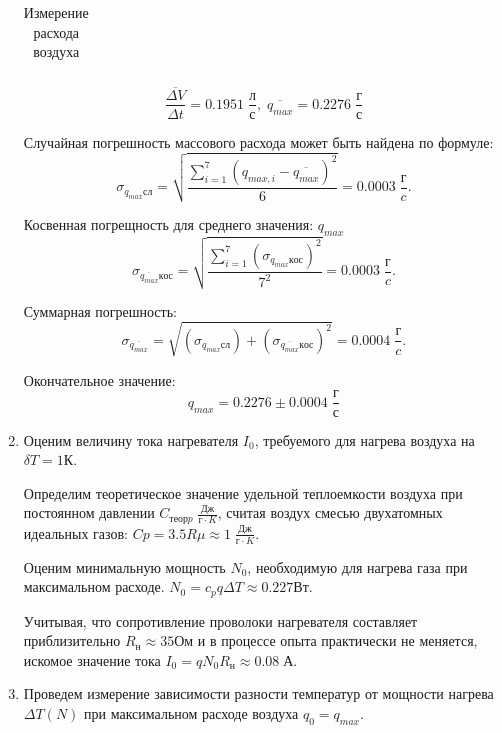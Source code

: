 \documentclass[a4paper,12pt]{article}
\begin{document}
\begin{enumerate}
\begin{table}
\begin{center}
\begin{tabular}{|c|c|c|c|c|}
	\end{tabular}
	\end{center}
	\caption{Измерение расхода воздуха}
	\end{table}
	$$\overline{\frac{\Delta V}{\Delta t}} = 0.1951 \; \frac{л}{с} ,\; \overline{q_{max}} = 0.2276 \; \frac{г}{с} $$
	
	Случайная погрешность массового расхода может быть найдена по формуле: $$\sigma_{q_{max}сл} =  \sqrt{\frac{\sum_{i=1}^{7} (q_{max,i}-\overline{q_{max}})^2}{6}} = 0.0003 \; \frac{г}{c}.$$
	
	Косвенная погрещность для среднего значения: $q_{max}$ $$\sigma_{\overline{q_{max}}кос} = \sqrt{\frac{\sum_{i=1}^{7} (\sigma_{q_{max}кос})^2}{7^2}} = 0.0003 \; \frac{г}{c}.$$
	
	Суммарная погрешность: $$\sigma_{\overline{q_{max}}} = \sqrt{(\sigma_{q_{max}сл})+(\sigma_{\overline{q_{max}}кос})^2} = 0.0004 \; \frac{г}{c}.$$
	
	Окончательное значение: $$q_{max} = 0.2276 \pm 0.0004 \; \frac{г}{с} $$
	
	\item Оценим величину тока нагревателя $I_{0}$, требуемого для нагрева воздуха на $\delta T = 1 {К}$.
	
	Определим теоретическое значение удельной теплоемкости воздуха при постоянном давлении $C_{теорp} \; \frac{Дж}{г\cdot K}$, считая воздух смесью двухатомных идеальных газов: $Cp = 3.5R\mu \approx 1 \; \frac{Дж}{г\cdot K}.$
 	
 	Оценим минимальную мощность $N_0$, необходимую для нагрева газа при максимальном расходе. $N_{0} = c_{p}q\Delta T \approx 0.227 {Вт}.$
	
	Учитывая, что сопротивление проволоки нагревателя составляет приблизительно $R_{н} \approx 35 {Ом}$ и в процессе опыта практически не меняется, искомое значение тока $I_{0} = q N_{0} R_{н} \approx 0.08 \; {А}.$
	
	\item Проведем измерение зависимости разности температур от мощности нагрева $\Delta T(N)$ при максимальном расходе воздуха $q_0 = q_{max}.$
	\begin{table}


\end{table}
\end{enumerate}
\end{document}
